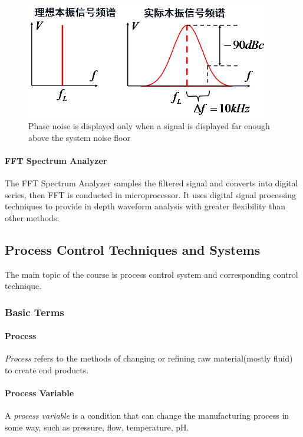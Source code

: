 \begin{figure}
  \centering
  \includegraphics[width=4.2in]{fig/fig_phase_noise.png}
  \caption{Phase noise is displayed only when a signal is displayed far enough above the system noise floor}\label{fig_phase_noise}
\end{figure}

\paragraph{FFT Spectrum Analyzer} The FFT Spectrum Analyzer samples the filtered signal and converts into digital series, then FFT is conducted in microprocessor. It uses digital signal processing techniques to provide in depth waveform analysis with greater flexibility than other methods.

\subsection{Process Control Techniques and Systems}
The main topic of the course is process control system and corresponding control technique.

\subsubsection{Basic Terms}

\paragraph{Process} \emph{Process} refers to the methods of changing or refining raw material(mostly fluid) to create end products.

\paragraph{Process Variable} A \emph{process variable} is a condition that can change the manufacturing process in some way, such as pressure, flow, temperature, pH.

